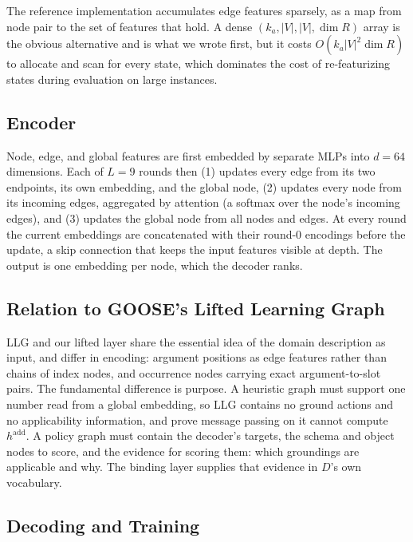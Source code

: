 \documentclass{article} %
\begin{document}
The reference implementation accumulates edge features sparsely, as a map
from node pair to the set of features that hold. A dense
$(k_a, |V|, |V|, \dim R)$ array is the obvious alternative and is what we
wrote first, but it costs $O(k_a |V|^2 \dim R)$ to allocate and scan for
every state, which dominates the cost of re-featurizing states during
evaluation on large instances.

\subsection{Encoder}
\label{app:encoder}

Node, edge, and global features are first embedded by
separate MLPs into $d{=}64$ dimensions. Each of $L{=}9$ rounds then (1)
updates every edge from its two endpoints, its own embedding, and the global
node, (2) updates every node from its incoming edges, aggregated by
attention (a softmax over the node's incoming edges), and (3) updates the
global node from all nodes and edges. At every round the current embeddings
are concatenated with their round-0 encodings before the update, a skip
connection that keeps the input features visible at depth. The output is
one embedding per node, which the decoder ranks.

\subsection{Relation to GOOSE's Lifted Learning Graph}
\label{app:llg}

LLG and our lifted layer share the essential idea of the domain
description as input, and differ in encoding: argument positions as edge
features rather than chains of index nodes, and occurrence nodes carrying
exact argument-to-slot pairs. The fundamental difference is purpose. A
heuristic graph must support one number read from a global embedding, so
LLG contains no ground actions and no applicability information, and
\citet{goose_v2} prove message passing on it cannot compute
$h^{\mathrm{add}}$. A policy graph must contain the decoder's targets, the
schema and object nodes to score, and the evidence for scoring them: which
groundings are applicable and why. The binding layer supplies that evidence
in $D$'s own vocabulary.

\subsection{Decoding and Training}
\label{app:decode}
\end{document}
